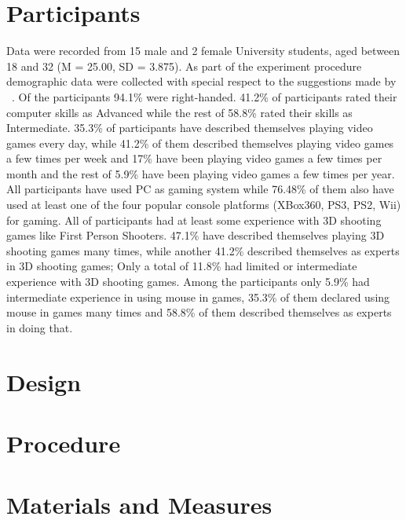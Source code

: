 
\section{Participants}
Data were recorded from 15 male and 2 female University students,
aged between 18 and 32 (M = 25.00, SD = 3.875). As part of the
experiment procedure demographic data were collected with special
respect to the suggestions made by ~\cite{?}. Of the participants 94.1\% were
right-handed. 41.2\% of participants rated their computer skills as Advanced
while the rest of 58.8\% rated their skills as Intermediate. 35.3\% of
participants have described themselves playing video games every day, while
41.2\% of them described themselves playing video games a few times per week
and 17\% have been playing video games a few times per month and the rest of
5.9\% have been playing video games a few times per year. All participants
have used PC as gaming system while 76.48\% of them also have used at least
one of the four popular console platforms (XBox360, PS3, PS2, Wii) for gaming.
All of participants had at least some experience with 3D shooting games like
First Person Shooters. 47.1\% have described themselves playing 3D shooting games
many times, while another 41.2\% described themselves as experts in
3D shooting games; Only a total of 11.8\% had limited or intermediate experience
with 3D shooting games. Among the participants only 5.9\% had intermediate
experience in using mouse in games, 35.3\% of them declared using mouse in games
many times and 58.8\% of them described themselves as experts in doing that.


\section{Design}
\section{Procedure}

\section{Materials and Measures}
